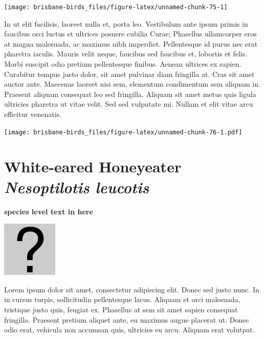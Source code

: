 \documentclass[]{book}
\let\origfigure\figure
\let\endorigfigure\endfigure
\renewenvironment{figure}[1][2] {
  \expandafter\origfigure\expandafter[H]
} {
  \endorigfigure
}
\begin{document}
\begin{figure}
\texttt{[image: brisbane-birds\_files/figure-latex/unnamed-chunk-75-1]} \caption{insert figure caption}\label{fig:unnamed-chunk-75}
\end{figure}

In ut elit facilisis, laoreet nulla et, porta leo. Vestibulum ante ipsum
primis in faucibus orci luctus et ultrices posuere cubilia Curae;
Phasellus ullamcorper eros at magna malesuada, ac maximus nibh
imperdiet. Pellentesque id purus nec erat pharetra iaculis. Mauris velit
neque, faucibus sed faucibus et, lobortis et felis. Morbi suscipit odio
pretium pellentesque finibus. Aenean ultrices ex sapien. Curabitur
tempus justo dolor, sit amet pulvinar diam fringilla at. Cras sit amet
auctor ante. Maecenas laoreet nisi sem, elementum condimentum sem
aliquam in. Praesent aliquam consequat leo sed fringilla. Aliquam sit
amet metus quis ligula ultricies pharetra ut vitae velit. Sed sed
vulputate mi. Nullam et elit vitae arcu efficitur venenatis.

\begin{figure}
\centering
\texttt{[image: brisbane-birds\_files/figure-latex/unnamed-chunk-76-1.pdf]}
\caption{\label{fig:unnamed-chunk-76}insert figure caption}
\end{figure}

\section{\texorpdfstring{White-eared Honeyeater \emph{Nesoptilotis
leucotis}}{White-eared Honeyeater Nesoptilotis leucotis}}\label{white-eared-honeyeater-nesoptilotis-leucotis}

\textbf{species level text in here}

\begin{figure}
\centering
\includegraphics{assets/missing.png}
\caption{No image for species}
\end{figure}

Lorem ipsum dolor sit amet, consectetur adipiscing elit. Donec sed justo
nunc. In in cursus turpis, sollicitudin pellentesque lacus. Aliquam et
orci malesuada, tristique justo quis, feugiat ex. Phasellus at sem sit
amet sapien consequat fringilla. Praesent pretium aliquet ante, eu
maximus augue placerat ut. Donec odio erat, vehicula non accumsan quis,
ultricies eu arcu. Aliquam erat volutpat.
\end{document}
